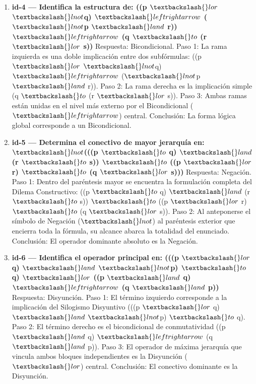\documentclass[11pt,a4paper,openany]{book}
\begin{document}
\begin{enumerate}[leftmargin=*]
\item \textbf{id-4 --- Identifica la estructura de: ((p $ \textbackslash\{\}lor $ $ \textbackslash\{\}lnot $q) $ \textbackslash\{\}leftrightarrow $ ($ \textbackslash\{\}lnot $p $ \textbackslash\{\}land $ r)) $ \textbackslash\{\}leftrightarrow $ (q $ \textbackslash\{\}to $ (r $ \textbackslash\{\}lor $ s))} Respuesta: Bicondicional. Paso 1: La rama izquierda es una doble implicación entre dos subfórmulas: ((p $ \textbackslash\{\}lor $ $ \textbackslash\{\}lnot $q) $ \textbackslash\{\}leftrightarrow $ ($ \textbackslash\{\}lnot $p $ \textbackslash\{\}land $ r)). Paso 2: La rama derecha es la implicación simple (q $ \textbackslash\{\}to $ (r $ \textbackslash\{\}lor $ s)). Paso 3: Ambas ramas están unidas en el nivel más externo por el Bicondicional ($ \textbackslash\{\}leftrightarrow $) central. Conclusión: La forma lógica global corresponde a un Bicondicional.

\item \textbf{id-5 --- Determina el conectivo de mayor jerarquía en: $ \textbackslash\{\}lnot $(((p $ \textbackslash\{\}to $ q) $ \textbackslash\{\}land $ (r $ \textbackslash\{\}to $ s)) $ \textbackslash\{\}to $ ((p $ \textbackslash\{\}lor $ r) $ \textbackslash\{\}to $ (q $ \textbackslash\{\}lor $ s)))} Respuesta: Negación. Paso 1: Dentro del paréntesis mayor se encuentra la formulación completa del Dilema Constructivo: ((p $ \textbackslash\{\}to $ q) $ \textbackslash\{\}land $ (r $ \textbackslash\{\}to $ s)) $ \textbackslash\{\}to $ ((p $ \textbackslash\{\}lor $ r) $ \textbackslash\{\}to $ (q $ \textbackslash\{\}lor $ s)). Paso 2: Al anteponerse el símbolo de Negación ($ \textbackslash\{\}lnot $) al paréntesis exterior que encierra toda la fórmula, su alcance abarca la totalidad del enunciado. Conclusión: El operador dominante absoluto es la Negación.

\item \textbf{id-6 --- Identifica el operador principal en: (((p $ \textbackslash\{\}lor $ q) $ \textbackslash\{\}land $ $ \textbackslash\{\}lnot $p) $ \textbackslash\{\}to $ q) $ \textbackslash\{\}lor $ ((p $ \textbackslash\{\}land $ q) $ \textbackslash\{\}leftrightarrow $ (q $ \textbackslash\{\}land $ p))} Respuesta: Disyunción. Paso 1: El término izquierdo corresponde a la implicación del Silogismo Disyuntivo (((p $ \textbackslash\{\}lor $ q) $ \textbackslash\{\}land $ $ \textbackslash\{\}lnot $p) $ \textbackslash\{\}to $ q). Paso 2: El término derecho es el bicondicional de conmutatividad ((p $ \textbackslash\{\}land $ q) $ \textbackslash\{\}leftrightarrow $ (q $ \textbackslash\{\}land $ p)). Paso 3: El operador de máxima jerarquía que vincula ambos bloques independientes es la Disyunción ($ \textbackslash\{\}lor $) central. Conclusión: El conectivo dominante es la Disyunción.


\end{enumerate}
\end{document}
